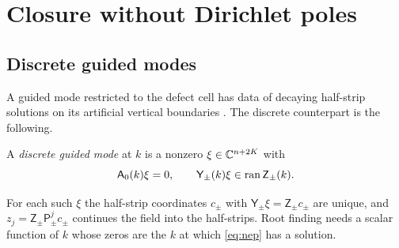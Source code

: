 \section{Closure without Dirichlet poles}\label{sec:closure}

\subsection{Discrete guided modes}\label{sec:discrete-modes}
A guided mode restricted to the defect cell has data of decaying
half-strip solutions on its artificial vertical boundaries \cite[Thm.~4.5]{Fliss2013}. The discrete counterpart is
the following.

\begin{definition}\label{def:discrete-mode}
A \emph{discrete guided mode} at $k$ is a nonzero $\xi\in\mathbb{C}^{n+2K}$ with
\begin{equation}\label{eq:nep}
  \mathsf A_0(k)\xi=0,\qquad \mathsf Y_\pm(k)\xi\in\operatorname{ran}\mathsf Z_\pm(k).
\end{equation}
\end{definition}

For each such $\xi$ the half-strip coordinates $c_\pm$ with $\mathsf Y_\pm\xi=\mathsf Z_\pm c_\pm$
are unique, and $z_j=\mathsf Z_\pm\mathsf P_\pm^jc_\pm$ continues the field into the
half-strips. Root finding needs a scalar function of $k$ whose zeros are the $k$
at which \eqref{eq:nep} has a solution.


